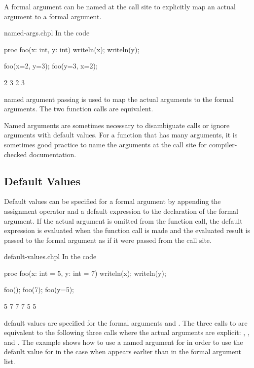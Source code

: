 A formal argument can be named at the call site to explicitly map an
actual argument to a formal argument.

\begin{chapelexample}{named-args.chpl}
In the code
\begin{chapel}
proc foo(x: int, y: int) { writeln(x); writeln(y); }

foo(x=2, y=3);
foo(y=3, x=2);
\end{chapel}
\begin{chapelprintoutput}
2
3
2
3
\end{chapelprintoutput}
named argument passing is used to map the actual arguments to the
formal arguments.  The two function calls are equivalent.
\end{chapelexample}

Named arguments are sometimes necessary to disambiguate calls or
ignore arguments with default values.  For a function that has many
arguments, it is sometimes good practice to name the arguments at the
call site for compiler-checked documentation.

\subsection{Default Values}
\label{Default_Values}

Default values can be specified for a formal argument by appending the
assignment operator and a default expression to the declaration of the
formal argument.  If the actual argument is omitted from the function
call, the default expression is evaluated when the function call is
made and the evaluated result is passed to the formal argument as if
it were passed from the call site.

\begin{chapelexample}{default-values.chpl}
In the code
\begin{chapel}
proc foo(x: int = 5, y: int = 7) { writeln(x); writeln(y); }

foo();
foo(7);
foo(y=5);
\end{chapel}
\begin{chapelprintoutput}
5
7
7
7
5
5
\end{chapelprintoutput}
default values are specified for the formal arguments 
and .  The three calls to  are equivalent to the
following three calls where the actual arguments are
explicit: , , and .
The example  shows how to use a named argument
for  in order to use the default value for  in the
case when  appears earlier than  in the formal
argument list.
\end{chapelexample}


